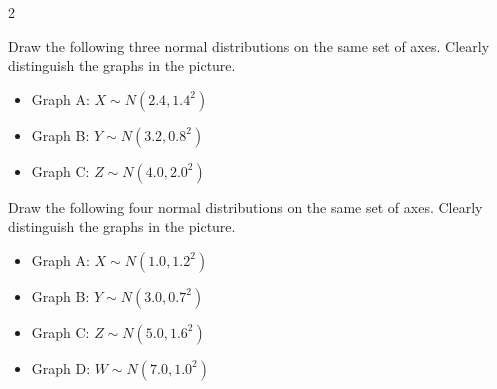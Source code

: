 \begin{multicols}{2}
		
		\vspace{-0.35cm}
		Draw the following three normal distributions on the same set of axes. Clearly distinguish the graphs in the picture.
		\begin{itemize}
			\item Graph A: $X\sim N(2.4,1.4^2)$
			\item Graph B: $Y\sim N(3.2,0.8^2)$
			\item Graph C: $Z\sim N(4.0,2.0^2)$
		\end{itemize}
		
		\vspace{-0.35cm}
		Draw the following four normal distributions on the same set of axes. Clearly distinguish the graphs in the picture.
		\begin{itemize}
			\item Graph A: $X\sim N(1.0,1.2^2)$
			\item Graph B: $Y\sim N(3.0,0.7^2)$
			\item Graph C: $Z\sim N(5.0,1.6^2)$
			\item Graph D: $W\sim N(7.0,1.0^2)$
		\end{itemize}
		
		
	\end{multicols}
	
